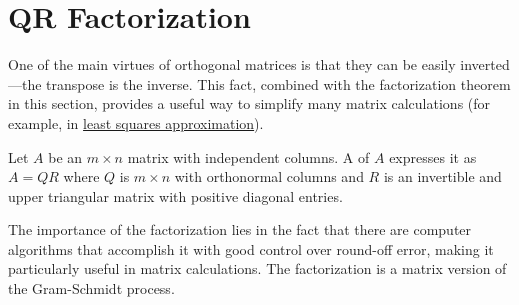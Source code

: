 \documentclass{ximera}
\begin{document}
\section*{QR Factorization}

    
One of the main virtues of orthogonal
matrices is that they can be easily inverted---the transpose is the
inverse. This fact, combined with the factorization theorem in this
section, provides a useful way to simplify many matrix calculations (for
    example, in \href{https://ximera.osu.edu/oerlinalg/LinearAlgebra/RTH-0030/main}{least squares approximation}).
    
    
\begin{definition}\label{def:QR-factorization}
Let $A$ be an $m \times n$ matrix with independent columns. A  of $A$ expresses it as $A = QR$ where $Q$ is $m \times n$ with orthonormal columns and $R$ is an invertible and upper triangular matrix with positive diagonal entries.
\end{definition}
    
The importance of the factorization
lies in the fact that there are computer algorithms that accomplish it
with good control over round-off error, making it particularly useful in
matrix calculations. The factorization is a matrix version of the Gram-Schmidt process.
    
\end{document}
